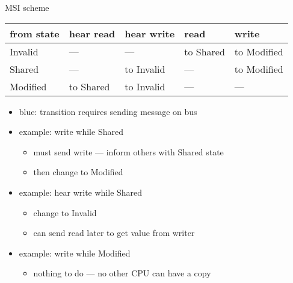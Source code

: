 \begin{frame}{MSI scheme}
\begin{tabular}{lllll}
from state & hear read & hear write & read & write \\ \hline
Invalid & --- & --- & \color{blue}to Shared & \color{blue}to Modified \\
Shared & --- & to Invalid & --- & \color{blue}to Modified \\
Modified & \color{blue}to Shared & \color{blue}to Invalid & --- & --- \\
\end{tabular}
\begin{itemize}
\item {\color{blue}blue}: transition requires sending message on bus
\item<2-> example: write while Shared 
    \begin{itemize}
    \item must send write --- inform others with Shared state
    \item then change to Modified
    \end{itemize}
\item<3-> example: hear write while Shared
    \begin{itemize}
    \item change to Invalid
    \item can send read later to get value from writer
    \end{itemize}
\item<3-> example: write while Modified
    \begin{itemize}
    \item nothing to do --- no other CPU can have a copy
    \end{itemize}
\end{itemize}
\end{frame}

